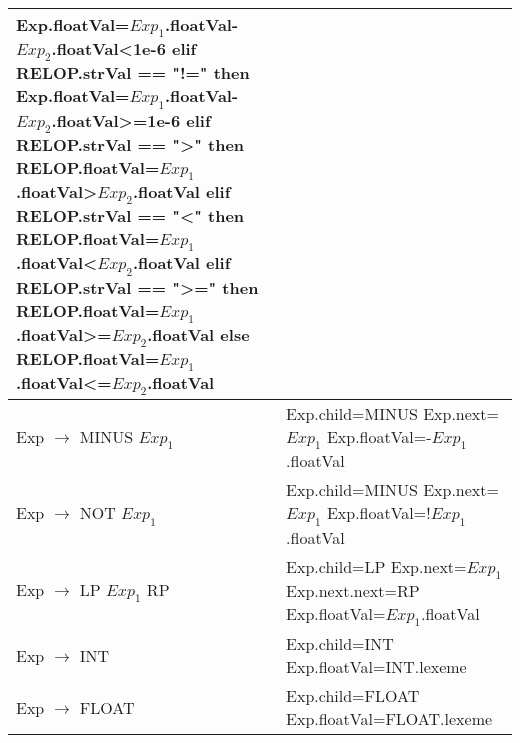 \documentclass[UTF8,11pt,a4paper]{ctexart}%
\begin{document}
\begin{center}
\begin{longtable}{l|l}
{            \hspace{2em}Exp.floatVal=$Exp_1$.floatVal-$Exp_2$.floatVal<1e-6\\
            \textbf{elif} RELOP.strVal == "!="\\
            \textbf{then} \\
            \hspace{2em}Exp.floatVal=$Exp_1$.floatVal-$Exp_2$.floatVal>=1e-6\\
            \textbf{elif} RELOP.strVal == ">"\\
            \textbf{then} \\
            \hspace{2em}RELOP.floatVal=$Exp_1$.floatVal>$Exp_2$.floatVal\\
            \textbf{elif} RELOP.strVal == "<"\\
            \textbf{then} \\
            \hspace{2em}RELOP.floatVal=$Exp_1$.floatVal<$Exp_2$.floatVal\\
            \textbf{elif} RELOP.strVal == ">="\\
            \textbf{then} \\
            \hspace{2em}RELOP.floatVal=$Exp_1$.floatVal>=$Exp_2$.floatVal\\
            \textbf{else} \\
            \hspace{2em}RELOP.floatVal=$Exp_1$.floatVal<=$Exp_2$.floatVal
        }\\
        \hline
        Exp $\rightarrow $ MINUS $Exp_1$ & \makecell[l]{
            Exp.child=MINUS\\
            Exp.next=$Exp_1$\\
            Exp.floatVal=-$Exp_1$.floatVal
        }\\
        \hline 
        Exp $ \rightarrow $ NOT $Exp_1$ & \makecell[l]{
            Exp.child=MINUS\\
            Exp.next=$Exp_1$\\
            Exp.floatVal=!$Exp_1$.floatVal
        }\\
        \hline
        Exp $ \rightarrow $ LP $Exp_1$ RP & \makecell[l]{
            Exp.child=LP\\
            Exp.next=$Exp_1$\\
            Exp.next.next=RP\\
            Exp.floatVal=$Exp_1$.floatVal
        }\\
        \hline 
        Exp $ \rightarrow $ INT & \makecell[l]{
            Exp.child=INT\\
            Exp.floatVal=INT.lexeme\\
        }\\
        \hline
        Exp $ \rightarrow $ FLOAT & \makecell[l]{
            Exp.child=FLOAT\\
            Exp.floatVal=FLOAT.lexeme\\
        }\\
    \end{longtable}
\end{center}
\end{document}
